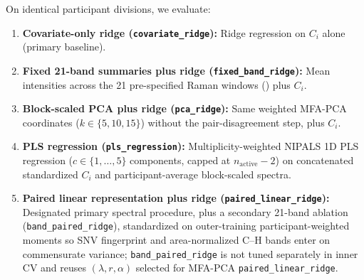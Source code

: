 \documentclass[preprint,12pt]{elsarticle}
\begin{document}
On identical participant divisions, we evaluate:
\begin{enumerate}
    \item \textbf{Covariate-only ridge (\texttt{covariate\_ridge}):} Ridge regression on $C_i$ alone (primary baseline).
    \item \textbf{Fixed 21-band summaries plus ridge (\texttt{fixed\_band\_ridge}):} Mean intensities across the 21 pre-specified Raman windows () plus $C_i$.
    \item \textbf{Block-scaled PCA plus ridge (\texttt{pca\_ridge}):} Same weighted MFA-PCA coordinates ($k \in \{5, 10, 15\}$) without the pair-disagreement step, plus $C_i$.
    \item \textbf{PLS regression (\texttt{pls\_regression}):} Multiplicity-weighted NIPALS 1D PLS regression ($c \in \{1, \dots, 5\}$ components, capped at $n_{\text{active}} - 2$) on concatenated standardized $C_i$ and participant-average block-scaled spectra.
    \item \textbf{Paired linear representation plus ridge (\texttt{paired\_linear\_ridge}):} Designated primary spectral procedure, plus a secondary 21-band ablation (\texttt{band\_paired\_ridge}), standardized on outer-training participant-weighted moments so SNV fingerprint and area-normalized C--H bands enter on commensurate variance; \texttt{band\_paired\_ridge} is not tuned separately in inner CV and reuses $(\lambda, r, \alpha)$ selected for MFA-PCA \texttt{paired\_linear\_ridge}.
\end{enumerate}
\end{document}
